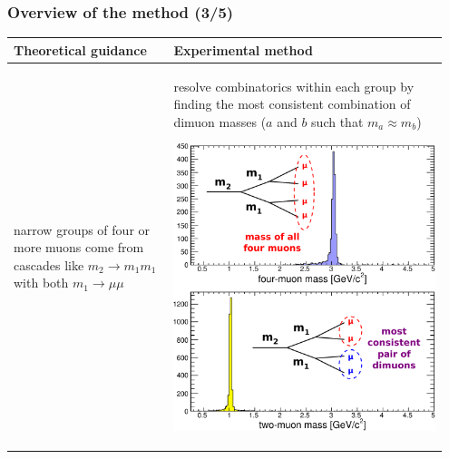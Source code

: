 \documentclass[compress]{beamer}
\begin{document}
\begin{frame}
\frametitle{Overview of the method (3/5)}

\renewcommand{\arraystretch}{1.7}
\begin{tabular}{p{0.35\linewidth} | p{0.6\linewidth}}
Theoretical guidance & Experimental method \\\hline

narrow groups of four or more muons come from cascades like $m_2 \to m_1 m_1$ with both $m_1 \to \mu\mu$ & resolve combinatorics within each group by finding the most consistent combination of dimuon masses ($a$ and $b$ such that $m_a \approx m_b$)

\vspace{0.3 cm}
\centering \includegraphics[width=0.8\linewidth]{four-two-muon-mass.pdf}

\vspace{-0.75 cm}
\end{tabular}
\end{frame}
\end{document}
